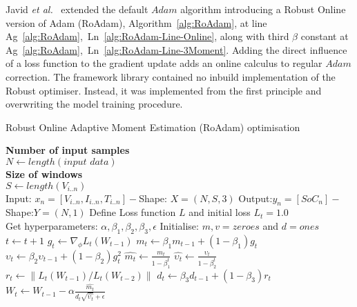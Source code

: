 %
Javid \textit{et al.}~\cite{javid_adaptive_2020} extended the default $Adam$ algorithm introducing a Robust Online version of Adam (RoAdam), Algorithm~\ref{alg:RoAdam}, at line \mbox{Ag~\ref{alg:RoAdam}, Ln~\ref{alg:RoAdam-Line-Online}}, along with third $\beta$ constant at \mbox{Ag~\ref{alg:RoAdam}, Ln~\ref{alg:RoAdam-Line-3Moment}}.
Adding the direct influence of a loss function to the gradient update adds an online calculus to regular $Adam$ correction.
The framework library contained no inbuild implementation of the Robust optimiser.
Instead, it was implemented from the first principle and overwriting the model training procedure.
\begin{algorithm}
  \caption{Robust Online Adaptive Moment Estimation (RoAdam) optimisation}
  \begin{algorithmic}[1]
    \STATE \textbf{Number of input samples} \\ $N\gets length(\textit{input data})$\\
    \STATE \textbf{Size of windows} \\ $S\gets length(V_{i..n})$\\
    \STATE Input: $x_n = [V_{i..n}, I_{i..n}, T_{i..n}] - $Shape: $X = (N, S, 3)$
    \STATE Output:$y_n = [SoC_{n}] - $Shape:$Y = (N, 1)$
    \STATE Define Loss function $L$ and initial loss $L_t = 1.0$ \label{alg:RoAdam-Line-Loss}\\
           Get hyperparameters: $\alpha, \beta_1, \beta_2, \beta_3, \epsilon$
    \STATE Initialise: $m,v=zeroes$ and $d=ones$ \label{alg:RoAdam-Line-Vars} \\
    \STATE $t \gets t+1$
    \STATE $g_t \gets \nabla_\phi L_t (W_{t-1})$ 
    \STATE $m_t \gets \beta_1 m_{t-1}+(1-\beta_1) g_t $ 
    \STATE $\upsilon_t \gets \beta_2 \upsilon_{t-1}+ \left(1-\beta_2 \right)g^2_t $ 
    \STATE $\hat{m_t} \gets \frac{m_t}{1-\beta^t_1}$ 
    \STATE $\hat{\upsilon_t} \gets \frac{\upsilon_t}{1-\beta^t_2} $ 
    \STATE $r_t \gets \parallel L_t\left(W_{t-1}\right)/L_t\left(W_{t-2}\right) \parallel $  
    \STATE $d_t \gets \beta_3 d_{t-1}+\left(1-\beta_3\right)r_t $ 
    \STATE $W_t \gets W_{t-1}- \alpha \frac{\hat{m_t}}{d_t\sqrt{\hat{\upsilon_t}}+\epsilon} $ 
    \ENDWHILE
  \end{algorithmic}
  \label{alg:RoAdam}
\end{algorithm}
